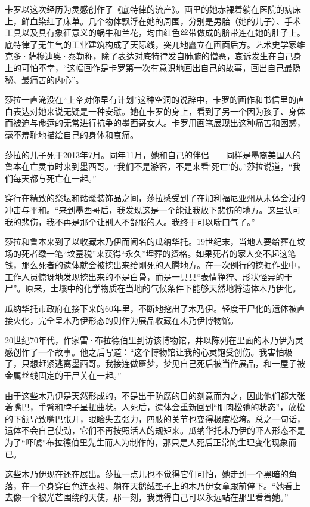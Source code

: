 \documentclass[12pt,oneside]{book}
\begin{document}
\begin{bookref}[frametitle={\cite{好好告别}}]
卡罗以这次经历为灵感创作了《底特律的流产》。画里的她赤裸着躺在医院的病床上，鲜血染红了床单。几个物体飘浮在她的周围，分别是男胎（她的儿子）、手术工具以及具有象征意义的蜗牛和兰花，均由红色丝带做成的脐带连在她的肚子上。底特律了无生气的工业建筑构成了天际线，突兀地矗立在画面后方。艺术史学家维克多·萨穆迪奥·泰勒称，除了表达对底特律发自肺腑的憎恶，哀诉发生在自己身上的可怕不幸，“这幅画作是卡罗第一次有意识地画出自己的故事，画出自己最隐秘、最痛苦的内心”。

莎拉一直淹没在“上帝对你早有计划”这种空洞的说辞中，卡罗的画作和书信里的直白表达对她来说无疑是一种安慰。她在卡罗的身上，看到了另一个因为孩子、身体而被迫与命运的无常进行抗争的墨西哥女人。卡罗用画笔展现出这种痛苦和困惑，毫不羞耻地描绘自己的身体和哀痛。

莎拉的儿子死于2013年7月。同年11月，她和自己的伴侣——同样是墨裔美国人的鲁本在亡灵节时来到墨西哥。“我们不是游客，不是来看‘死亡’的。”莎拉说道，“我们每天都与死亡在一起。”

穿行在精致的祭坛和骷髅装饰品之间，莎拉感受到了在加利福尼亚州从未体会过的冲击与平和。“来到墨西哥后，我发现这是一个能让我放下悲伤的地方。这里认可我的悲伤，我不再是那个让别人不舒服的人。我终于可以喘口气了。”

莎拉和鲁本来到了以收藏木乃伊而闻名的瓜纳华托。19世纪末，当地人要给葬在坟场的死者缴一笔“坟墓税”来获得“永久”埋葬的资格。如果死者的家人交不起这笔钱，那么死者的遗体就会被挖出来给刚死的人腾地方。在一次例行的挖掘作业中，工作人员惊讶地发现挖出来的不是白骨，而是一具具“表情狰狞、形状怪异的干尸”。原来，土壤中的化学物质在当地的气候条件下能够天然地将遗体木乃伊化。

瓜纳华托市政府在接下来的60年里，不断地挖出了木乃伊。轻度干尸化的遗体被直接火化，完全呈木乃伊形态的则作为展品收藏在木乃伊博物馆。

20世纪70年代，作家雷·布拉德伯里到访该博物馆，并以陈列在里面的木乃伊为灵感创作了一个故事。他之后写道：“这个博物馆让我的心灵饱受创伤。我害怕极了，只想赶紧逃离墨西哥。我接连做噩梦，梦见自己死后被当作展品，和一屋子被金属丝线固定的干尸关在一起。”

由于这些木乃伊是天然形成的，不是出于防腐的目的刻意而为之，因此他们都大张着嘴巴，手臂和脖子呈扭曲状。人死后，遗体会重新回到“肌肉松弛的状态”，放松的下颌导致嘴巴张开，眼睑失去张力，四肢的关节也变得极度松垮。总之一句话，遗体不会自己使劲，它们不再按照活人的规矩来。瓜纳华托木乃伊的吓人形态不是为了“吓唬”布拉德伯里先生而人为制作的，那只是人死后正常的生理变化现象而已。

这些木乃伊现在还在展出。莎拉一点儿也不觉得它们可怕，她走到一个黑暗的角落，在一个身穿白色连衣裙、躺在天鹅绒垫子上的木乃伊女童跟前停下。“她看上去像一个被光芒围绕的天使，那一刻，我觉得自己可以永远站在那里看着她。”


\end{bookref}
\end{document}
